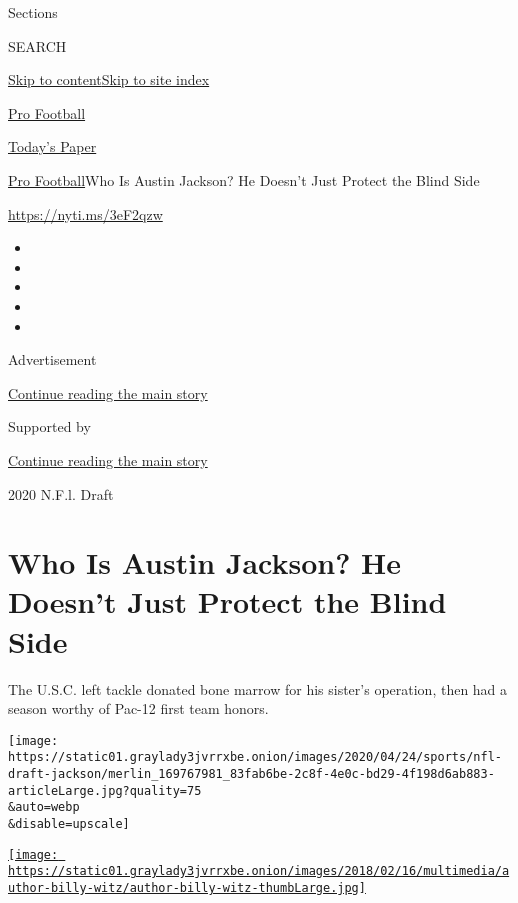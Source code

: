 Sections

SEARCH

\protect\hyperlink{site-content}{Skip to
content}\protect\hyperlink{site-index}{Skip to site index}

\href{https://www.nytimes3xbfgragh.onion/section/sports/football}{Pro
Football}

\href{https://myaccount.nytimes3xbfgragh.onion/auth/login?response_type=cookie\&client_id=vi}{}

\href{https://www.nytimes3xbfgragh.onion/section/todayspaper}{Today's
Paper}

\href{/section/sports/football}{Pro Football}\textbar{}Who Is Austin
Jackson? He Doesn't Just Protect the Blind Side

\url{https://nyti.ms/3eF2qzw}

\begin{itemize}
\item
\item
\item
\item
\item
\end{itemize}

Advertisement

\protect\hyperlink{after-top}{Continue reading the main story}

Supported by

\protect\hyperlink{after-sponsor}{Continue reading the main story}

2020 N.F.l. Draft

\hypertarget{who-is-austin-jackson-he-doesnt-just-protect-the-blind-side}{%
\section{Who Is Austin Jackson? He Doesn't Just Protect the Blind
Side}\label{who-is-austin-jackson-he-doesnt-just-protect-the-blind-side}}

The U.S.C. left tackle donated bone marrow for his sister's operation,
then had a season worthy of Pac-12 first team honors.

\texttt{[image: https://static01.graylady3jvrrxbe.onion/images/2020/04/24/sports/nfl-draft-jackson/merlin\_169767981\_83fab6be-2c8f-4e0c-bd29-4f198d6ab883-articleLarge.jpg?quality=75\\\&auto=webp\\\&disable=upscale]}

\href{https://www.nytimes3xbfgragh.onion/by/billy-witz}{\texttt{[image: https://static01.graylady3jvrrxbe.onion/images/2018/02/16/multimedia/author-billy-witz/author-billy-witz-thumbLarge.jpg]}}

